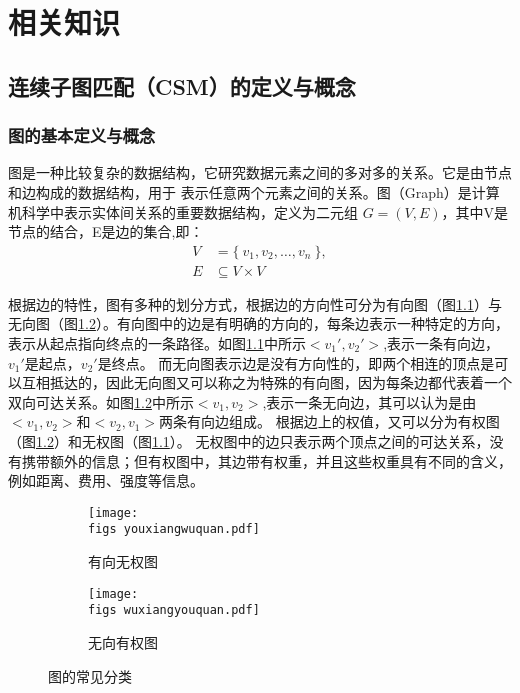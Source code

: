 \chapter{相关知识}

\section{连续子图匹配（CSM）的定义与概念}
\subsection{图的基本定义与概念}
图是一种比较复杂的数据结构，它研究数据元素之间的多对多的关系。它是由节点和边构成的数据结构，用于
表示任意两个元素之间的关系。图（Graph）是计算机科学中表示实体间关系的重要数据结构，定义为二元组
$G=(V,E)$，其中V是节点的结合，E是边的集合,即：
\begin{align*}
  V &= \{\ v_1, v_2, \dots, v_n\ \},\\
  E &\subseteq V \times V
\end{align*}

根据边的特性，图有多种的划分方式，根据边的方向性可分为有向图（图\ref{fig:example_noweight}）与无向图（图\ref{fig:example_weight}）。有向图中的边是有明确的方向的，每条边表示一种特定的方向，表示从起点指向终点的一条路径。如图\ref{fig:example_noweight}中所示$<v_1',v_2'>$,表示一条有向边，$v_1'$是起点，$v_2'$是终点。
而无向图表示边是没有方向性的，即两个相连的顶点是可以互相抵达的，因此无向图又可以称之为特殊的有向图，因为每条边都代表着一个双向可达关系。如图\ref{fig:example_weight}中所示$<v_1,v_2>$,表示一条无向边，其可以认为是由$<v_1,v_2>$和$<v_2,v_1>$两条有向边组成。
根据边上的权值，又可以分为有权图（图\ref{fig:example_weight}）和无权图（图\ref{fig:example_noweight}）。
无权图中的边只表示两个顶点之间的可达关系，没有携带额外的信息；但有权图中，其边带有权重，并且这些权重具有不同的含义，例如距离、费用、强度等信息。

\begin{figure}[h!]
    \def\wscorevone{0.48}
    \centering
        \begin{subfigure}[t]{\wscorevone\linewidth}
            \centering
            \resizebox{\linewidth}{!}
            {
                \texttt{[image: \\figs youxiangwuquan.pdf]}
            }
            \caption{有向无权图}
            \label{fig:example_noweight}
        \end{subfigure}
        \hfill
        \begin{subfigure}[t]{\wscorevone\linewidth}
            \centering
            \resizebox{\linewidth}{!}
            {
                \texttt{[image: \\figs wuxiangyouquan.pdf]}
            }
            \caption{无向有权图}
            \label{fig:example_weight}
        \end{subfigure}
        \label{fig:definition}
        \caption{图的常见分类}
    \end{figure}


